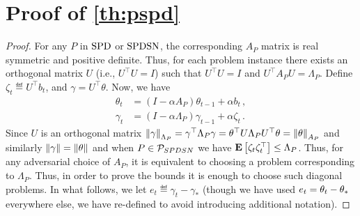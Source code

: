 \section{Proof of \cref{th:pspd}}
\label{sec:pspd}
\thpspd*
\begin{proof}
For any $P$ in $\SPD$ or $\SPDSN$,  the corresponding $A_P$ matrix is real symmetric and positive definite. Thus, for each problem instance there exists an orthogonal matrix $U$ (i.e., $U^\top U=I$) such that $U^\top U=I$ and $U^\top A_P U=\Lambda_P$. Define $\zeta_t\eqdef U^\top b_t$, and $\gamma=U^\top \theta$. Now, we have
\begin{align}
\theta_t&=(I-\alpha A_P)\theta_{t-1}+\alpha b_t\,,\\
\label{eq:gamrec}\gamma_t&=(I-\alpha \Lambda_P)\gamma_{t-1}+\alpha \zeta_t\,.
\end{align}
Since $U$ is an orthogonal matrix $\norm{\gamma}_{\Lambda_P}=\gamma^\top \Lambda_P \gamma= \theta^\top U \Lambda_P U^\top \theta=\norm{\theta}_{A_P}$ and similarly $\norm{\gamma}=\norm{\theta}$ and when $P\in \P_{SPDSN}$ we have $\EE{\zeta_t \zeta_t^\top}\leq \Lambda_P$. Thus, for any adversarial choice of $A_P$, it is equivalent to choosing a problem corresponding to $\Lambda_P$. Thus, in order to prove the bounds it is enough to choose such diagonal problems. In what follows, we let $e_t\eqdef\gamma_t-\gamma_*$ (though we have used $e_t=\theta_t-\ts$ everywhere else, we have re-defined to avoid introducing additional notation).


\end{proof}
